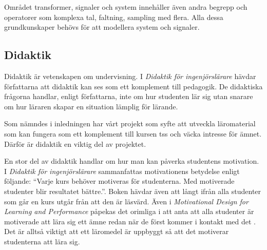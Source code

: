 \documentclass[12pt,a4paper,twoside,openright]{article}
\begin{document}




Området transformer, signaler och system innehåller även andra begrepp
och operatorer som komplexa tal, faltning, sampling med flera. Alla
dessa grundkunskaper behövs för att modellera system och signaler.

\subsection{Didaktik}
\label{sec:didaktik}
Didaktik är vetenskapen om undervisning. I \textit{Didaktik för
  ingenjörslärare}\cite{didaktik_for_ingenjorslarare} hävdar
författarna att didaktik kan ses som ett komplement till pedagogik. De
didaktiska frågorna handlar, enligt författarna, inte om hur studenten
lär sig utan snarare om hur läraren skapar en situation lämplig för
lärande.

Som nämndes i inledningen har vårt projekt som syfte att utveckla
läromaterial som kan fungera som ett komplement till kursen
\gls{tss} och väcka intresse för ämnet. Därför är didaktik en
viktig del av projektet.

En stor del av didaktik handlar om hur man kan påverka studentens
motivation. I \textit{Didaktik för ingenjörslärare} sammanfattas
motivationens betydelse enligt följande: ``Varje kurs behöver motiveras
för studenterna. Med motiverade studenter blir resultatet bättre.''.
Boken hävdar även att långt ifrån alla studenter som går en kurs utgår
från att den är läsvärd. Även i \textit{Motivational Design for
  Learning and Performance} påpekas det orimliga i att anta att alla
studenter är motiverade att lära sig ett ämne redan när de först
kommer i kontakt med det \cite{motivational_design}. Det är alltså
viktigt att ett läromedel är uppbyggt så att det motiverar studenterna
att lära sig.
\end{document}

